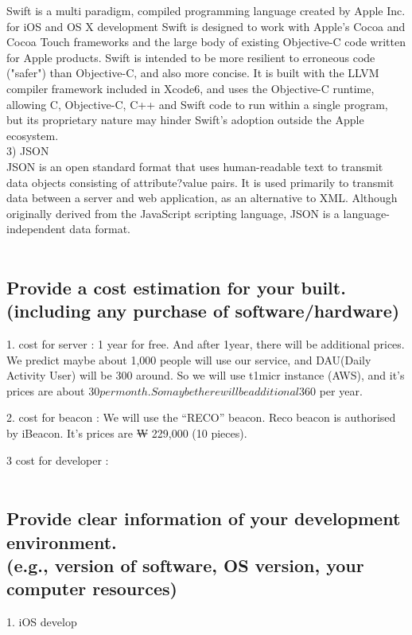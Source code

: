 \documentclass[conference]{IEEEtran}
\begin{document}
Swift is a multi paradigm, compiled 
programming language created by Apple Inc. for iOS and OS X development Swift is designed to work with Apple's Cocoa and 
Cocoa Touch frameworks and the large body of existing Objective-C code written for Apple products. Swift is intended to be more resilient to erroneous code ("safer") than Objective-C, and also more concise. It is built with the LLVM compiler framework included in Xcode6, and uses the Objective-C runtime, allowing C, Objective-C, C++ and Swift code to run within a single program, but its proprietary nature may hinder Swift's adoption outside the Apple ecosystem. \\



3) JSON\\
JSON is an open standard format that uses human-readable text to transmit data objects consisting of attribute?value pairs. It is used primarily to transmit data between a server and web application, as an alternative to XML. Although originally derived from the JavaScript scripting language, JSON is a language-independent data format.\\\\

\subsection{Provide a cost estimation for your built. \\
(including any purchase of software/hardware)}

1. cost for server : 1 year for free. And after 1year, there will be additional prices. We predict maybe about 1,000 people will use our service, and DAU(Daily Activity User) will be 300 around. So we will use t1micr instance (AWS), and it’s prices are about $30 per month. So maybe there will be additional $360 per year. 

2. cost for beacon : We will use the “RECO” beacon. Reco beacon is authorised by iBeacon. It’s prices are ₩ 229,000 (10 pieces). 

3 cost for developer : \\\\

\subsection{Provide clear information of your development environment.\\ (e.g., version of software, OS version, your computer resources) }
1. iOS develop 
\end{document}
